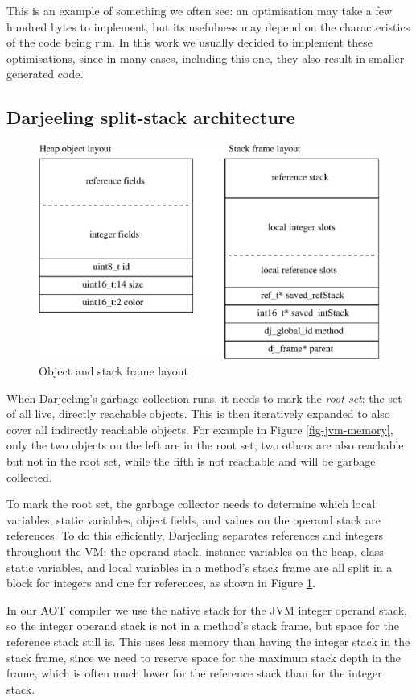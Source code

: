 This is an example of something we often see: an optimisation may take a few hundred bytes to implement, but its usefulness may depend on the characteristics of the code being run. In this work we usually decided to implement these optimisations, since in many cases, including this one, they also result in smaller generated code.

\subsection{Darjeeling split-stack architecture}
\label{sec-darjeeling-split-architecure}
\begin{figure}
  \centering
  \includegraphics[width=0.6\linewidth]{object-and-stack-frame-layout.eps}
  \caption{Object and stack frame layout}
  \label{fig-object-and-stack-frame-layout}
\end{figure}

When Darjeeling's garbage collection runs, it needs to mark the \emph{root set}: the set of all live, directly reachable objects. This is then iteratively expanded to also cover all indirectly reachable objects. For example in Figure \ref{fig-jvm-memory}, only the two objects on the left are in the root set, two others are also reachable but not in the root set, while the fifth is not reachable and will be garbage collected.

To mark the root set, the garbage collector needs to determine which local variables, static variables, object fields, and values on the operand stack are references. To do this efficiently, Darjeeling separates references and integers throughout the VM: the operand stack, instance variables on the heap, class static variables, and local variables in a method's stack frame are all split in a block for integers and one for references, as shown in Figure \ref{fig-object-and-stack-frame-layout}.

In our AOT compiler we use the native stack for the JVM integer operand stack, so the integer operand stack is not in a method's stack frame, but space for the reference stack still is. This uses less memory than having the integer stack in the stack frame, since we need to reserve space for the maximum stack depth in the frame, which is often much lower for the reference stack than for the integer stack.


